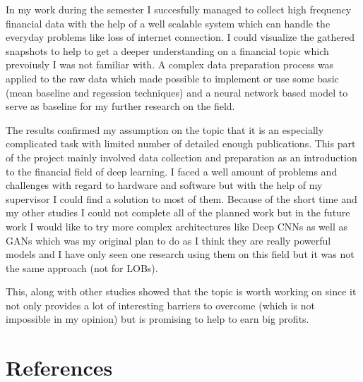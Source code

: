 \documentclass[11pt,a4paper,oneside]{article}
\begin{document}
In my work during the semester I succesfully managed to collect high frequency financial data with the help of a well
scalable system which can handle the everyday problems like loss of internet connection. I could visualize the gathered 
snapshots to help to get a deeper understanding on a financial topic which prevoiusly I was not familiar with. A complex 
data preparation process was applied to the raw data which made possible to implement or use some basic (mean baseline 
and regession techniques) and a neural network based model to serve as baseline for my further research on the field. 

The results confirmed my assumption on the topic that it is an especially complicated task with limited number of 
detailed enough publications. This part of the project mainly involved data collection and preparation as an 
introduction to the financial field of deep learning. I faced a well amount of problems and challenges with regard to 
hardware and software but with the help of my supervisor I could find a solution to most of them. Because of the short 
time and my other studies I could not complete all of the planned work but in the future work I would like to try more
complex architectures like Deep CNNs as well as GANs which was my original plan to do as I think they are really 
powerful models and I have only seen one research using them on this field but it was not the same approach (not for 
LOBs).

This, along with other studies showed that the topic is worth working on since it not only provides a lot of interesting 
barriers to overcome (which is not impossible in my opinion) but is promising to help to earn big profits.

\newpage
\section{References}
\label{sec:references}
\end{document}
